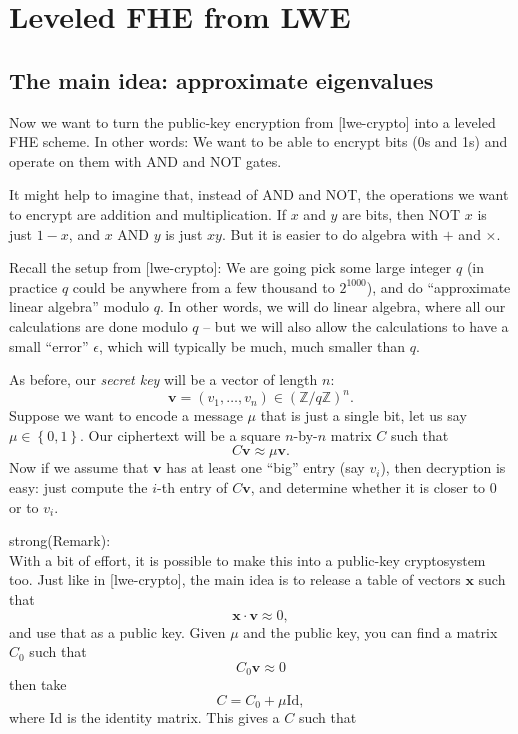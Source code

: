 \section{Leveled FHE from LWE}\label{fhe}

\subsection{The main idea: approximate eigenvalues}

Now we want to turn the public-key encryption from {[}lwe-crypto{]} into
a leveled FHE scheme. In other words: We want to be able to encrypt bits
(0s and 1s) and operate on them with AND and NOT gates.

It might help to imagine that, instead of AND and NOT, the operations we
want to encrypt are addition and multiplication. If \(x\) and \(y\) are
bits, then NOT \(x\) is just \(1 - x\), and \(x\) AND \(y\) is just
\(xy\). But it is easier to do algebra with \(+\) and \(\times\).

Recall the setup from {[}lwe-crypto{]}: We are going pick some large
integer \(q\) (in practice \(q\) could be anywhere from a few thousand
to \(2^{1000}\)), and do ``approximate linear algebra'' modulo \(q\). In
other words, we will do linear algebra, where all our calculations are
done modulo \(q\) -- but we will also allow the calculations to have a
small ``error'' \(\epsilon\), which will typically be much, much smaller
than \(q\).

As before, our \emph{secret key} will be a vector of length \(n\):
\[\mathbf{v} = \left( v_{1},\ldots,v_{n} \right) \in ({\mathbb{Z}}/q{\mathbb{Z}})^{n}.\]
Suppose we want to encode a message \(\mu\) that is just a single bit,
let us say \(\mu \in \left\{ 0,1 \right\}\). Our ciphertext will be a
square \(n\)-by-\(n\) matrix \(C\) such that
\[C\mathbf{v} \approx \mu\mathbf{v}.\] Now if we assume that
\(\mathbf{v}\) has at least one ``big'' entry (say \(v_{i}\)), then
decryption is easy: just compute the \(i\)-th entry of \(C\mathbf{v}\),
and determine whether it is closer to \(0\) or to \(v_{i}\).

strong(Remark):\\
With a bit of effort, it is possible to make this into a public-key
cryptosystem too. Just like in {[}lwe-crypto{]}, the main idea is to
release a table of vectors \(\mathbf{x}\) such that
\[\mathbf{x} \cdot \mathbf{v} \approx 0,\] and use that as a public key.
Given \(\mu\) and the public key, you can find a matrix \(C_{0}\) such
that \[C_{0}\mathbf{v} \approx 0\] then take
\[C = C_{0} + \mu\mathrm{\text{Id}},\] where \(\mathrm{\text{Id}}\) is
the identity matrix. This gives a \(C\) such that

